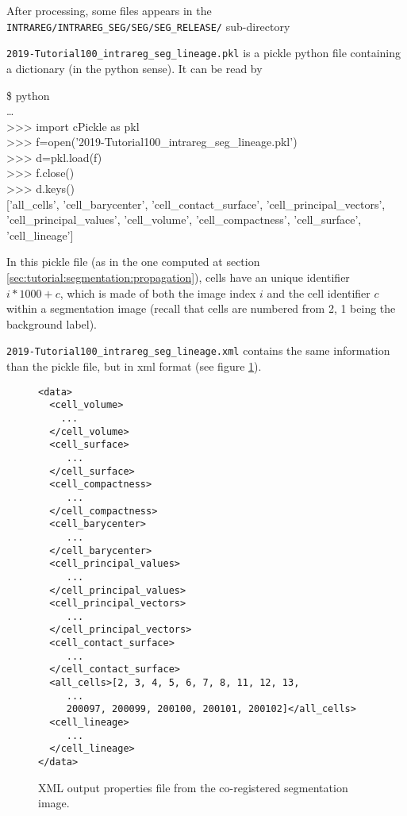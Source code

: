 After processing, some files appears in the \texttt{INTRAREG/INTRAREG\_SEG/SEG/SEG\_RELEASE/} sub-directory 

\mbox{}
\mbox{}


\texttt{2019-Tutorial100\_intrareg\_seg\_lineage.pkl} is a pickle python file
containing a dictionary (in the python sense). It can be read by
\begin{code}{0.8}
  \$ python \\
  \ldots \\
  >>> import cPickle as pkl \\
  >>> f=open('2019-Tutorial100\_intrareg\_seg\_lineage.pkl') \\
  >>> d=pkl.load(f) \\
  >>> f.close()  \\
  >>> d.keys() \\{}
  ['all\_cells', 'cell\_barycenter', 'cell\_contact\_surface', 'cell\_principal\_vectors', 'cell\_principal\_values', 'cell\_volume', 'cell\_compactness', 'cell\_surface', 'cell\_lineage']
\end{code}
In this pickle file (as in the one computed at section
\ref{sec:tutorial:segmentation:propagation}), cells have an unique
identifier $i * 1000 + c$, which is made of 
both the image index $i$ and the cell identifier $c$ within a segmentation
image (recall that cells are numbered from 2, 1 being the background
label).

\texttt{2019-Tutorial100\_intrareg\_seg\_lineage.xml} contains the
same information than the pickle file, but in xml format (see figure
\ref{fig:tutorial:seg:properties:xml}).

\begin{figure}
\begin{framed}
\begin{verbatim}
<data>
  <cell_volume>
    ...
  </cell_volume>
  <cell_surface>
     ...
  </cell_surface>
  <cell_compactness>
     ...
  </cell_compactness>
  <cell_barycenter>
     ...
  </cell_barycenter>
  <cell_principal_values>
     ...
  </cell_principal_values>
  <cell_principal_vectors>
     ...
  </cell_principal_vectors>
  <cell_contact_surface>
     ...
  </cell_contact_surface>
  <all_cells>[2, 3, 4, 5, 6, 7, 8, 11, 12, 13, 
     ...
     200097, 200099, 200100, 200101, 200102]</all_cells>
  <cell_lineage>
     ...
  </cell_lineage>
</data>
\end{verbatim}
\end{framed}
\caption{\label{fig:tutorial:seg:properties:xml} XML output properties
  file from the co-registered segmentation image.}
\end{figure}

